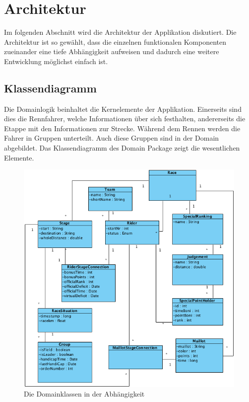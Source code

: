 \chapter{Architektur}
Im folgenden Abschnitt wird die Architektur der Applikation diskutiert. Die Architektur ist so gewählt, dass die einzelnen funktionalen Komponenten zueinander eine tiefe Abhängigkeit aufweisen und dadurch eine weitere Entwicklung möglichst einfach ist.

\section{Klassendiagramm}
Die Domainlogik beinhaltet die Kernelemente der Applikation. Einerseits sind dies die Rennfahrer, welche Informationen über sich festhalten, andererseits die Etappe mit den Informationen zur Strecke. Während dem Rennen werden die Fahrer in Gruppen unterteilt. Auch diese Gruppen sind in der Domain abgebildet. Das Klassendiagramm des Domain Package zeigt die wesentlichen Elemente.

\begin{figure}[h!]
\caption{Die Domainklassen in der Abhängigkeit}
\label{fig:domain}
\centering
\includegraphics{05bericht/images/domain.png}
\end{figure} 


